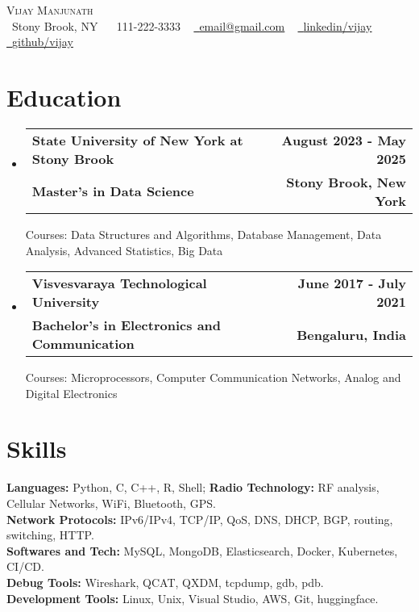 \documentclass[letterpaper,11pt]{article}
\makeatletter
\newcommand{\resumeSubheading}[4]{
  \vspace{-2pt}\item
    \begin{tabular*}{1.0\textwidth}[t]{l@{\extracolsep{\fill}}r}
      \textbf{#1} & \textbf{\small #2} \\
      \textbf{\small#3} & \textbf{\small #4} \\
    \end{tabular*}\vspace{-7pt}
}
\newcommand{\resumeSubHeadingListStart}{\begin{itemize}[leftmargin=0.0in, label={}]}
\newcommand{\resumeSubHeadingListEnd}{\end{itemize}}
\makeatother
\begin{document}
\begin{center}
    {\Huge \scshape Vijay Manjunath} \\ \vspace{1pt}
    \small  \raisebox{0.0\height}\faMapMarker\ Stony Brook, NY ~
    \small \raisebox{-0.1\height}\faPhone\ 111-222-3333 ~ \href{email@gmail.com}{\raisebox{-0.2\height}\faEnvelope\  \underline{email@gmail.com}} ~ 
    \href{https://www.linkedin.com/in/vijay-manjunath/}{\raisebox{-0.2\height}\faLinkedin\ \underline{linkedin/vijay}}  ~
    \href{http link to github}{\raisebox{-0.2\height}\faGithub\ \underline{github/vijay}}
    \vspace{-8pt}
\end{center}


\section{Education}

 \resumeSubHeadingListStart
	\resumeSubheading
  	{State University of New York at Stony Brook}{August 2023 - May 2025}
  	{Master's in Data Science}{Stony Brook, New York}
   
        {Courses: Data Structures and Algorithms, Database Management, Data Analysis, Advanced Statistics, Big Data}
        \vspace{-5pt}
  
  	\resumeSubheading
  	{Visvesvaraya Technological University}{June 2017 - July 2021}
  	{Bachelor's in Electronics and Communication}{Bengaluru, India}
         
         {Courses: Microprocessors, Computer Communication Networks, Analog and Digital Electronics}
 \resumeSubHeadingListEnd
 \vspace{-15pt}


\section{Skills}
\begin{itemize}[leftmargin=0.0 in, label={}]
  \small{\item{
        \textbf{Languages:} Python, C, C++, R, Shell; 
        \textbf{Radio Technology:} RF analysis, Cellular Networks, WiFi, Bluetooth, GPS.\\
        \textbf{Network Protocols:} IPv6/IPv4, TCP/IP, QoS, DNS, DHCP, BGP, routing, switching, HTTP.\\
        \textbf{Softwares and Tech:}  MySQL, MongoDB, Elasticsearch, Docker, Kubernetes, CI/CD.\\
        \textbf{Debug Tools:}  Wireshark, QCAT, QXDM, tcpdump, gdb, pdb.\\
        \textbf{Development Tools:}  Linux, Unix, Visual Studio, AWS, Git, huggingface.\\
   }}
 \end{itemize}
\vspace{-15pt}
\end{document}
